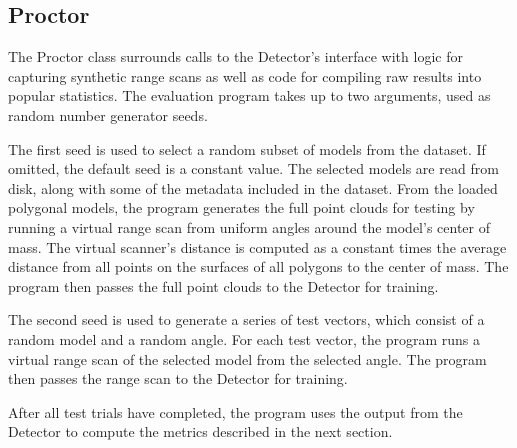 \subsection{Proctor}
The Proctor class surrounds calls to the Detector's interface with logic for capturing synthetic range scans as well as code for compiling raw results into popular statistics.
The evaluation program takes up to two arguments, used as random number generator seeds.

The first seed is used to select a random subset of models from the dataset. If omitted, the default seed is a constant value.
The selected models are read from disk, along with some of the metadata included in the dataset.
From the loaded polygonal models, the program generates the full point clouds for testing by running a virtual range scan from uniform angles around the model's center of mass.
The virtual scanner's distance is computed as a constant times the average distance from all points on the surfaces of all polygons to the center of mass.
The program then passes the full point clouds to the Detector for training.

The second seed is used to generate a series of test vectors, which consist of a random model and a random angle.
For each test vector, the program runs a virtual range scan of the selected model from the selected angle.
The program then passes the range scan to the Detector for training.

After all test trials have completed, the program uses the output from the Detector to compute the metrics described in the next section.
